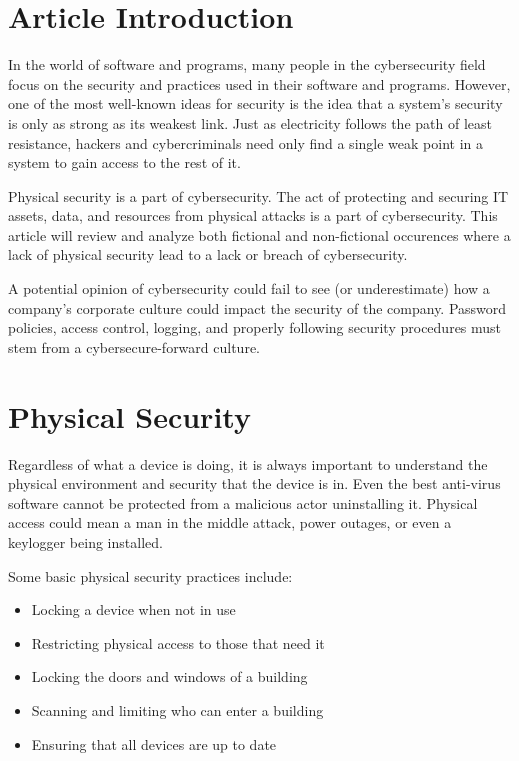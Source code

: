 \documentclass[acmsmall]{acmart}
\begin{document}
\maketitle
\fancyfoot{}
\thispagestyle{empty}

\section{Article Introduction}
In the world of software and programs, many people in the cybersecurity
field focus on the security and practices used in their software and programs.
However, one of the most well-known ideas for security is the idea that
a system's security is only as strong as its weakest link. Just as electricity
follows the path of least resistance, hackers and cybercriminals need only
find a single weak point in a system to gain access to the rest of
it.

Physical security is a part of cybersecurity. The act of protecting and
securing IT assets, data, and resources from physical attacks is a part
of cybersecurity. This article will review and analyze both fictional and
non-fictional occurences where a lack of physical security lead to a lack
or breach of cybersecurity.

A potential opinion of cybersecurity could fail to see (or underestimate) how
a company's corporate culture could impact the security of the company.
Password policies, access control, logging, and properly following
security procedures must stem from a cybersecure-forward culture.

\section{Physical Security}
Regardless of what a device is doing, it is always important to understand
the physical environment and security that the device is in. Even the
best anti-virus software cannot be protected from a malicious actor
uninstalling it. Physical access could mean a man in the middle attack,
power outages, or even a keylogger being installed.

Some basic physical security practices include:
\begin{itemize}
  \item Locking a device when not in use
  \item Restricting physical access to those that need it
  \item Locking the doors and windows of a building
  \item Scanning and limiting who can enter a building
  \item Ensuring that all devices are up to date
\end{itemize}
\end{document}
